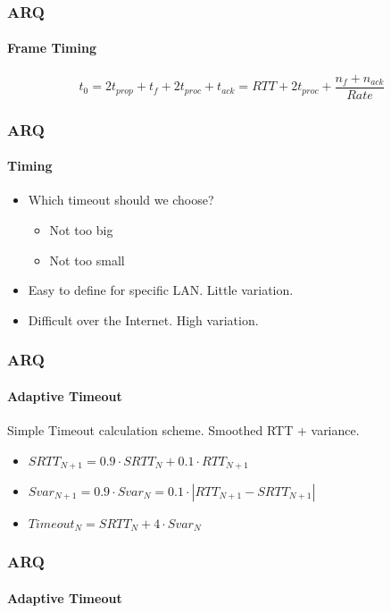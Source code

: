 \begin{frame}		
	
	\frametitle{ARQ}
	\framesubtitle{Frame Timing}
	
	\begin{figure}[H]
	\end{figure}
	
	$$t_0 = 2t_{prop} + t_f + 2t_{proc} + t_{ack} = RTT + 2t_{proc} + \dfrac{n_f + n_{ack}}{Rate}$$
	
\end{frame}

\begin{frame}		
	\frametitle{ARQ}
	\framesubtitle{Timing}
	
	
	\begin{itemize}
		\item Which timeout should we choose?
		\begin{itemize}
			\item Not too big
			\item Not too small
		\end{itemize}
		\item Easy to define for specific LAN. Little variation. 
		\item Difficult over the Internet. High variation.
	\end{itemize}
	
	
\end{frame}


\begin{frame}		
	\frametitle{ARQ}
	\framesubtitle{Adaptive Timeout}
	
	Simple Timeout calculation scheme\footnotemark[1]. Smoothed RTT + variance.
	
	\begin{itemize}
		\item $SRTT_{N+1} = 0.9 \cdot SRTT_N + 0.1 \cdot RTT_{N+1}$
		\item $Svar_{N+1} = 0.9 \cdot Svar_N = 0.1 \cdot |RTT_{N+1} - SRTT_{N+1}|$
		\item $Timeout_N = SRTT_N + 4 \cdot Svar_N$
	\end{itemize}
\end{frame}

\begin{frame}		
	\frametitle{ARQ}
	\framesubtitle{Adaptive Timeout}
	
	\begin{figure}[H]
	\end{figure}

\end{frame}